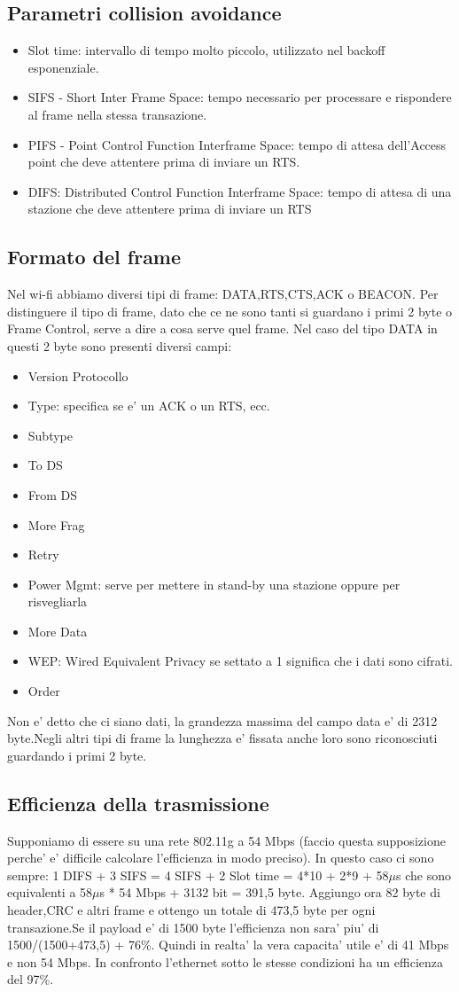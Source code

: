 \subsection{Parametri collision avoidance}
\begin{itemize}
  \item Slot time: intervallo di tempo molto piccolo, utilizzato nel backoff esponenziale.
  \item SIFS - Short Inter Frame Space: tempo necessario per processare e rispondere al frame nella stessa transazione.
  \item PIFS - Point Control Function Interframe Space: tempo di attesa dell'Access point che deve attentere prima di inviare un RTS.
  \item DIFS: Distributed Control Function Interframe Space: tempo di attesa di una stazione che deve attentere prima di inviare un RTS
\end{itemize}
\subsection{Formato del frame}
Nel wi-fi abbiamo diversi tipi di frame: DATA,RTS,CTS,ACK o BEACON. Per distinguere il tipo di frame, dato che ce ne sono tanti si guardano i primi 2 byte o Frame Control, serve a dire a cosa serve quel frame. Nel caso del tipo DATA in questi 2 byte sono presenti diversi campi:
\begin{itemize}
  \item Version Protocollo
  \item Type: specifica se e' un ACK o un RTS, ecc.
  \item Subtype
  \item To DS
  \item From DS
  \item More Frag
  \item Retry
  \item Power Mgmt: serve per mettere in stand-by una stazione oppure per risvegliarla
  \item More Data
  \item WEP: Wired Equivalent Privacy se settato a 1 significa che i dati sono cifrati. 
  \item Order
\end{itemize}
Non e' detto che ci siano dati, la grandezza massima del campo data e' di 2312 byte.Negli altri tipi di frame la lunghezza e' fissata anche loro sono riconosciuti guardando i primi 2 byte.
\subsection{Efficienza della trasmissione}
Supponiamo di essere su una rete 802.11g a 54 Mbps (faccio questa supposizione perche' e' difficile calcolare l'efficienza in modo preciso). In questo caso ci sono sempre: 1 DIFS + 3 SIFS = 4 SIFS + 2 Slot time = 4*10 + 2*9 + 58$\mu$s che sono equivalenti a 58$\mu$s * 54 Mbps + 3132 bit = 391,5 byte. Aggiungo ora 82 byte di header,CRC e altri frame e ottengo un totale di 473,5 byte per ogni transazione.Se il payload e' di 1500 byte l'efficienza non sara' piu' di 1500/(1500+473,5) + 76\%. Quindi in realta' la vera capacita' utile e' di 41 Mbps e non 54 Mbps. In confronto l'ethernet sotto le stesse condizioni ha un efficienza del 97\%.
